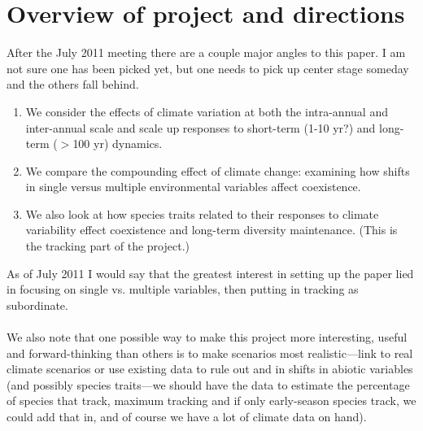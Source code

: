 \documentclass[11pt,a4paper,oneside]{article}
\begin{document}
\section{Overview of project and directions}
\noindent After the July 2011 meeting there are a couple major
angles to this paper. I am not sure one has been picked yet, but one needs to pick up center stage
someday and the others fall behind.
\begin{enumerate}
\item We consider the effects of climate variation at both the
intra-annual and inter-annual scale and scale up responses to
short-term (1-10 yr?) and long-term (\(>\)100 yr) dynamics. 
\item We compare the compounding effect of climate change: examining
  how shifts in single versus multiple environmental variables affect
  coexistence.
\item We also look at how species traits related to their responses to
  climate variability effect coexistence and long-term diversity
  maintenance. (This is the tracking part of the project.) 
\end{enumerate}
As of July 2011 I would say that the greatest interest in setting up
the paper lied in focusing on single vs. multiple variables, then
putting in tracking as subordinate. \\
\\
\noindent We also note that one possible way to make this project more
interesting, useful and forward-thinking than others is to make
scenarios most realistic---link to real climate scenarios or use
existing data to rule out and in shifts in abiotic variables (and
possibly species traits---we should have the data to estimate the
percentage of species that track, maximum tracking and if only
early-season species track, we could add that in, and of course we
have a lot of climate data on hand).
\end{document}
